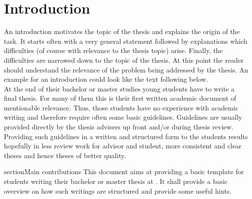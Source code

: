 
\chapter{Introduction}
\label{sect:introduction}


An introduction motivates the topic of the thesis and explains the origin of the task. 
It starts often with a very general statement followed by explanations which difficulties (of course with relevance to the thesis topic) arise.
Finally, the difficulties are narrowed down to the topic of the thesis.
At this point the reader should understand the relevance of the problem being addressed by the thesis.
An example for an introduction could look like the text following below. \\

At the end of their bachelor or master studies young students have to write a final thesis.
For many of them this is their first written academic document of mentionable relevance.
Thus, those students have no experience with academic writing and therefore require often some basic guidelines.
Guidelines are usually provided directly by the thesis advisers up front and/or during thesis review.
Providing such guidelines in a written and structured form to the students results hopefully in less review work for advisor and student, more consistent and clear theses and hence theses of better quality. 

section{Main contributions}
\label{sect:main_contributions}
This document aims at providing a basic template for students writing their bachelor or master thesis at .
It shall provide a basic overview on how such writings are structured and provide some useful hints.


